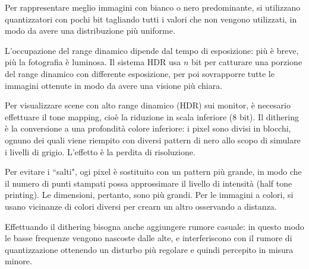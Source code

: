 Per rappresentare meglio immagini con bianco o nero predominante, si utilizzano quantizzatori con pochi bit tagliando tutti i valori che non vengono utilizzati, in modo da avere una distribuzione più uniforme. 

L'occupazione del range dinamico dipende dal tempo di esposizione: più è breve, più la fotografia è luminosa. Il sistema HDR usa $n$ bit per catturare una porzione del range dinamico con differente esposizione, per poi sovrapporre tutte le immagini ottenute in modo da avere una visione più chiara. 

Per visualizzare scene con alto range dinamico (HDR) sui monitor, è necesario effettuare il tone mapping, cioè la riduzione in scala inferiore (8 bit). Il dithering è la conversione a una profondità colore inferiore: i pixel sono divisi in blocchi, ognuno dei quali viene riempito con diversi pattern di nero allo scopo di simulare i livelli di grigio. L'effetto è la perdita di risoluzione.

Per evitare i ``salti", ogi pixel è sostituito con un pattern più grande, in modo che il numero di punti stampati possa approssimare il livello di intensità (half tone printing). Le dimensioni, pertanto, sono più grandi. Per le immagini a colori, si usano vicinanze di colori diversi per crearn un altro osservando a distanza. 

Effettuando il dithering bisogna anche aggiungere rumore casuale: in questo modo le basse frequenze vengono nascoste dalle alte, e interferiscono con il rumore di quantizzazione ottenendo un disturbo più regolare e quindi percepito in misura minore.
